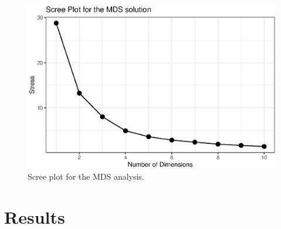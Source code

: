 \begin{figure}[!h]
    \centering
    \includegraphics[width = \linewidth]{images/stress_plot.eps}
    \caption{Scree plot for the MDS analysis.}
    \label{fig:stress_plot}
\end{figure}
\section{Results} \label{sec:acousticlandscape:results}
